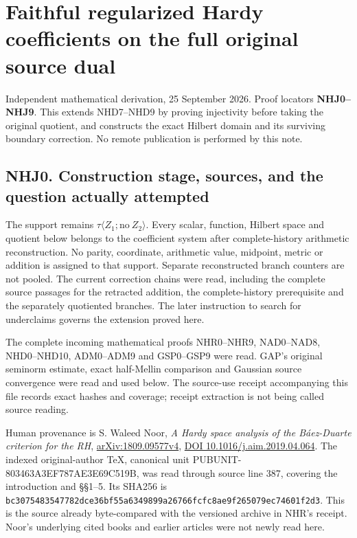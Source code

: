 \section{Faithful regularized Hardy coefficients on the full original
source
dual}\label{faithful-regularized-hardy-coefficients-on-the-full-original-source-dual}

Independent mathematical derivation, 25 September 2026. Proof locators
\textbf{NHJ0--NHJ9}. This extends NHD7--NHD9 by proving injectivity
before taking the original quotient, and constructs the exact Hilbert
domain and its surviving boundary correction. No remote publication is
performed by this note.

\subsection{NHJ0. Construction stage, sources, and the question actually
attempted}\label{nhj0.-construction-stage-sources-and-the-question-actually-attempted}

The support remains \(\tau\langle Z_1;\mathrm{no}\ Z_2\rangle\). Every
scalar, function, Hilbert space and quotient below belongs to the
coefficient system after complete-history arithmetic reconstruction. No
parity, coordinate, arithmetic value, midpoint, metric or addition is
assigned to that support. Separate reconstructed branch counters are not
pooled. The current correction chains were read, including the complete
source passages for the retracted addition, the complete-history
prerequisite and the separately quotiented branches. The later
instruction to search for underclaims governs the extension proved here.

The complete incoming mathematical proofs NHR0--NHR9, NAD0--NAD8,
NHD0--NHD10, ADM0--ADM9 and GSP0--GSP9 were read. GAP's original
seminorm estimate, exact half-Mellin comparison and Gaussian source
convergence were read and used below. The source-use receipt
accompanying this file records exact hashes and coverage; receipt
extraction is not being called source reading.

Human provenance is S. Waleed Noor, \emph{A Hardy space analysis of the
Báez-Duarte criterion for the RH},
\href{https://arxiv.org/abs/1809.09577v4}{arXiv:1809.09577v4},
\href{https://doi.org/10.1016/j.aim.2019.04.064}{DOI
10.1016/j.aim.2019.04.064}. The indexed original-author TeX, canonical
unit PUBUNIT-803463A3EF787AE3E69C519B, was read through source line 387,
covering the introduction and §§1--5. Its SHA256 is
\nolinkurl{bc3075483547782dce36bf55a6349899a26766fcfc8ae9f265079ec74601f2d3}.
This is the source already byte-compared with the versioned archive in
NHR's receipt. Noor's underlying cited books and earlier articles were
not newly read here.

